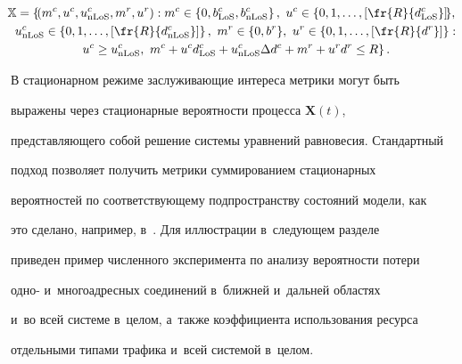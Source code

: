 \begin{multline*}

\hspace*{-3.87529pt}\mathbb{X}= \left\{\!\left( m^c, u^c, u^c_{\mathrm{nLoS}}, m^r, u^r\right): m^c\in \left\{

0, b^c_{\mathrm{LoS}}, b^c_{\mathrm{nLoS}}\right\},\ u^c\in \left\{ 0,1,\ldots , 

\left[ \fr{R}{d^c_{\mathrm{LoS}}}\right]\!\right\}\!,\right.\\

u^c_{\mathrm{nLoS}} \in \left\{ 0,1,\ldots, \left[ 

\fr{R}{d^c_{\mathrm{nLoS}}}\right]\right\},\

m^r\in \{0, b^r\},\ u^r\in \left\{ 0,1,\ldots , \left[ \fr{R}{d^r}\right]\right\}:\\

\left.u^c\geq u^c_{\mathrm{nLoS}}, \ m^c+u^c d^c_{\mathrm{LoS}}+ 

u^c_{\mathrm{nLoS}} \Delta d^c +m^r +u^r d^r \leq R

\vphantom{\left[ \fr{R}{d^c_{\mathrm{LoS}}}\right]}

\right\}.


\end{multline*}

  

  В стационарном режиме за\-слу\-жи\-ва\-ющие интереса мет\-ри\-ки могут быть 

выражены через стационарные вероятности процесса $\bm{X}(t)$, 

пред\-став\-ля\-юще\-го собой решение сис\-те\-мы уравнений равновесия. Стандартный 

подход позволяет получить метрики суммированием стационарных 

вероятностей по соответствующему подпространству со\-сто\-яний модели, как 

это сделано, например, в~\cite{15-gai-1}. Для иллюстрации в~сле\-ду\-ющем разделе 

приведен пример чис\-лен\-но\-го эксперимента по анализу ве\-ро\-ят\-ности потери 

одно- и~многоадресных соединений в~ближ\-ней и~дальней областях 

и~во всей сис\-те\-ме в~целом, а~так\-же коэффициента использования ресурса 

отдельными типами трафика и~всей сис\-те\-мой в~целом.




